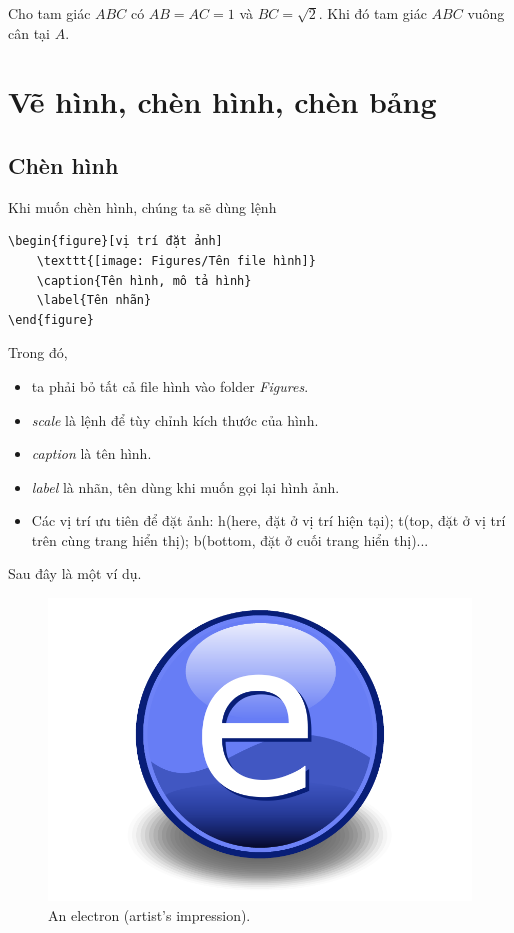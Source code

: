 \begin{example}
Cho tam giác $ABC$ có $AB=AC=1$ và $BC=\sqrt{2}$. Khi đó tam giác $ABC$ vuông cân tại $A$.
\end{example}

\begin{definition}
\end{definition}



\section{Vẽ hình, chèn hình, chèn bảng}
\subsection{Chèn hình}
Khi muốn chèn hình, chúng ta sẽ dùng lệnh
\begin{verbatim} 
\begin{figure}[vị trí đặt ảnh]
    \texttt{[image: Figures/Tên file hình]}
    \caption{Tên hình, mô tả hình}
    \label{Tên nhãn}
\end{figure}
\end{verbatim}
Trong đó,
\begin{itemize}
    \item ta phải bỏ tất cả file hình vào folder \textit{Figures}.
    \item \textit{scale} là lệnh để tùy chỉnh kích thước của hình.
    \item \textit{caption} là tên hình.
    \item \textit{label} là nhãn, tên dùng khi muốn gọi lại hình ảnh.
    \item Các vị trí ưu tiên để đặt ảnh: h(here, đặt ở vị trí hiện tại); t(top, đặt ở vị trí trên cùng trang hiển thị); b(bottom, đặt ở cuối trang hiển thị)...
\end{itemize}

Sau đây là một ví dụ.

\begin{figure}[!ht]
\centering
\includegraphics[scale=0.2]{Figures/Electron}
\caption[An Electron]{An electron (artist's impression).}
\label{fig:Electron1}
\end{figure}

